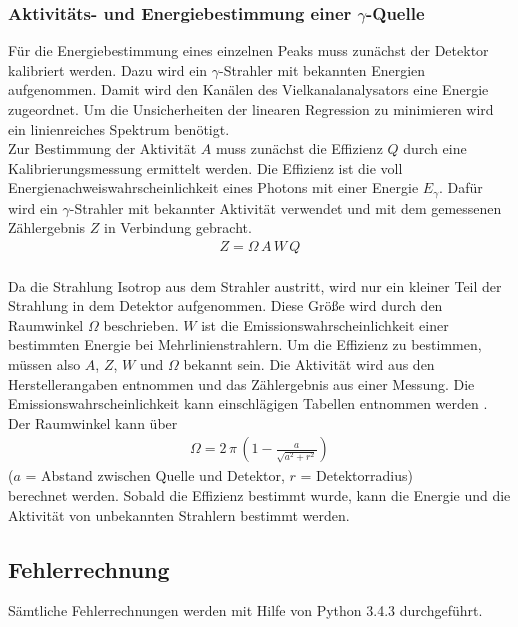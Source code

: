 \subsubsection{Aktivitäts- und Energiebestimmung einer \texorpdfstring{$\gamma$}{}-Quelle}
Für die Energiebestimmung eines einzelnen Peaks muss zunächst der Detektor kalibriert werden. Dazu wird ein $\gamma$-Strahler mit bekannten Energien aufgenommen. Damit wird den Kanälen des Vielkanalanalysators eine Energie zugeordnet. Um die Unsicherheiten der linearen Regression zu minimieren wird ein linienreiches Spektrum benötigt. \\
Zur Bestimmung der Aktivität $A$ muss zunächst die Effizienz $Q$ durch eine Kalibrierungsmessung ermittelt werden. Die Effizienz ist die voll Energienachweiswahrscheinlichkeit eines Photons mit einer Energie $E_\gamma$. Dafür wird ein $\gamma$-Strahler mit bekannter Aktivität verwendet und mit dem gemessenen Zählergebnis $Z$ in Verbindung gebracht.
\begin{align}
	Z = \Omega\,A\,W\,Q
	\label{eqn:Zählergebnis}
\end{align}
 \\
Da die Strahlung Isotrop aus dem Strahler austritt, wird nur ein kleiner Teil der Strahlung in dem Detektor aufgenommen. Diese Größe wird durch den Raumwinkel $\Omega$ beschrieben. $W$ ist die Emissionswahrscheinlichkeit einer bestimmten Energie bei Mehrlinienstrahlern. Um die Effizienz zu bestimmen, müssen also $A$, $Z$, $W$ und $\Omega$ bekannt sein. Die Aktivität wird aus den Herstellerangaben entnommen und das Zählergebnis aus einer Messung. Die Emissionswahrscheinlichkeit kann einschlägigen Tabellen entnommen werden \cite{V18}. Der Raumwinkel kann über
\begin{align}
	\Omega = 2\,\pi\,\left(1 - \frac{a}{\sqrt{a^2 + r^2}} \right)
	\label{eqn:Raumwinkel}
\end{align}
\hfil {\footnotesize($a$ = Abstand zwischen Quelle und Detektor, $r$ = Detektorradius)} \hfil \\
berechnet werden. Sobald die Effizienz bestimmt wurde, kann die Energie und die Aktivität von unbekannten Strahlern bestimmt werden.









\subsection{Fehlerrechnung}
Sämtliche Fehlerrechnungen werden mit Hilfe von Python 3.4.3 durchgeführt.

